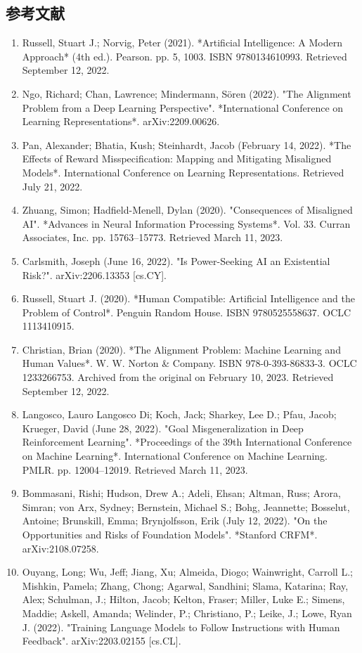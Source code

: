 \subsection{参考文献}
\begin{enumerate}
\item Russell, Stuart J.; Norvig, Peter (2021). *Artificial Intelligence: A Modern Approach* (4th ed.). Pearson. pp. 5, 1003. ISBN 9780134610993. Retrieved September 12, 2022.
\item Ngo, Richard; Chan, Lawrence; Mindermann, Sören (2022). "The Alignment Problem from a Deep Learning Perspective". *International Conference on Learning Representations*. arXiv:2209.00626.
\item Pan, Alexander; Bhatia, Kush; Steinhardt, Jacob (February 14, 2022). *The Effects of Reward Misspecification: Mapping and Mitigating Misaligned Models*. International Conference on Learning Representations. Retrieved July 21, 2022.
\item Zhuang, Simon; Hadfield-Menell, Dylan (2020). "Consequences of Misaligned AI". *Advances in Neural Information Processing Systems*. Vol. 33. Curran Associates, Inc. pp. 15763–15773. Retrieved March 11, 2023.
\item Carlsmith, Joseph (June 16, 2022). "Is Power-Seeking AI an Existential Risk?". arXiv:2206.13353 [cs.CY].
\item Russell, Stuart J. (2020). *Human Compatible: Artificial Intelligence and the Problem of Control*. Penguin Random House. ISBN 9780525558637. OCLC 1113410915.
\item Christian, Brian (2020). *The Alignment Problem: Machine Learning and Human Values*. W. W. Norton & Company. ISBN 978-0-393-86833-3. OCLC 1233266753. Archived from the original on February 10, 2023. Retrieved September 12, 2022.
\item Langosco, Lauro Langosco Di; Koch, Jack; Sharkey, Lee D.; Pfau, Jacob; Krueger, David (June 28, 2022). "Goal Misgeneralization in Deep Reinforcement Learning". *Proceedings of the 39th International Conference on Machine Learning*. International Conference on Machine Learning. PMLR. pp. 12004–12019. Retrieved March 11, 2023.
\item Bommasani, Rishi; Hudson, Drew A.; Adeli, Ehsan; Altman, Russ; Arora, Simran; von Arx, Sydney; Bernstein, Michael S.; Bohg, Jeannette; Bosselut, Antoine; Brunskill, Emma; Brynjolfsson, Erik (July 12, 2022). "On the Opportunities and Risks of Foundation Models". *Stanford CRFM*. arXiv:2108.07258.
\item Ouyang, Long; Wu, Jeff; Jiang, Xu; Almeida, Diogo; Wainwright, Carroll L.; Mishkin, Pamela; Zhang, Chong; Agarwal, Sandhini; Slama, Katarina; Ray, Alex; Schulman, J.; Hilton, Jacob; Kelton, Fraser; Miller, Luke E.; Simens, Maddie; Askell, Amanda; Welinder, P.; Christiano, P.; Leike, J.; Lowe, Ryan J. (2022). "Training Language Models to Follow Instructions with Human Feedback". arXiv:2203.02155 [cs.CL].

\end{enumerate}
